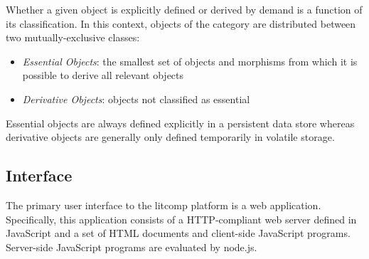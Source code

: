 Whether a given object is explicitly defined or derived by demand is a
function of its classification. In this context, objects of the category
are distributed between two mutually-exclusive classes:

\begin{itemize}

\item {\em Essential Objects}: the smallest set of objects and morphisms
from which it is possible to derive all relevant objects

\item {\em Derivative Objects}: objects not classified as essential

\end{itemize}

Essential objects are always defined explicitly in a persistent data
store whereas derivative objects are generally only defined temporarily
in volatile storage.

\subsection {Interface}

The primary user interface to the litcomp platform is a web
application. Specifically, this application consists of a HTTP-compliant
web server defined in JavaScript and a set of HTML documents and
client-side JavaScript programs. Server-side JavaScript programs are
evaluated by node.js.


